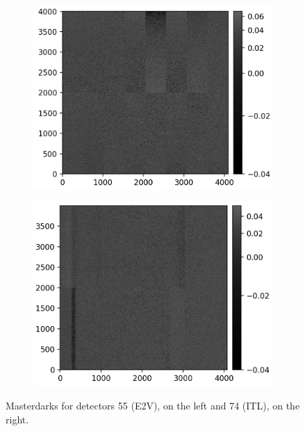 \begin{figure}[!htb]
     \centering
     \begin{subfigure}[b]{0.49\textwidth}
         \centering
         \includegraphics[width=\textwidth]{Figures/Super_dark_55.png}
     \end{subfigure}
     \hfill
     \begin{subfigure}[b]{0.49\textwidth}
         \centering
         \includegraphics[width=\textwidth]{Figures/Super_dark_74.png}
     \end{subfigure}
        \caption{Masterdarks for detectors 55 (E2V), on the left and 74 (ITL), on the right.}
        \label{fig:superdark}
\end{figure}


